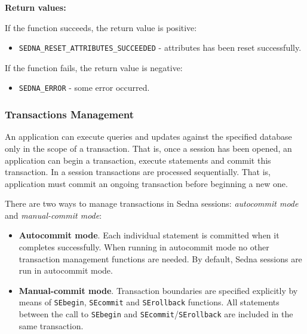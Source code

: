 \documentclass[a4paper,12pt]{article}
\newenvironment{citemize}
{\begin{itemize}
  \setlength{\itemsep}{0pt}
  \setlength{\parskip}{0pt}
  \setlength{\parsep}{0pt}}
{\end{itemize}}
\begin{document}
\noindent
\textbf{Return values:}

\medskip

\noindent
If the function succeeds, the return value is positive:

\begin{citemize}
\item\verb!SEDNA_RESET_ATTRIBUTES_SUCCEEDED! - attributes has been reset
successfully.
\end{citemize}

\noindent
If the function fails, the return value is negative:

\begin{citemize}
\item\verb!SEDNA_ERROR! - some error occurred.
\end{citemize}


\subsubsection{Transactions Management}
An application can execute queries and updates against the specified database
only in the scope of a transaction. That is, once a session has been opened, an
application can begin a transaction, execute statements and commit this
transaction. In a session transactions are processed sequentially. That is,
application must commit an ongoing transaction before beginning a new one.

There are two ways to manage transactions in Sedna sessions: \emph{autocommit
mode} and \emph{manual-commit mode}:

\begin{itemize}
\item\textbf{Autocommit mode}. Each individual statement is committed when it
completes successfully. When running in autocommit mode no other transaction
management functions are needed. By default, Sedna sessions are run in
autocommit mode.
\item\textbf{Manual-commit mode}. Transaction boundaries are specified
explicitly by means of \verb!SEbegin!, \verb!SEcommit! and \verb!SErollback!
functions. All statements between the call to \verb!SEbegin! and
\verb!SEcommit!/\verb!SErollback! are included in the same transaction.
\end{itemize}
\end{document}
